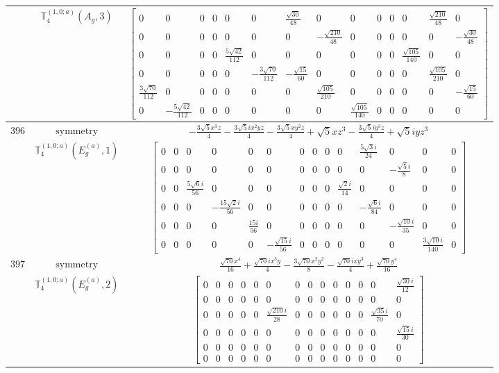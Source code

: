 \documentclass[fleqn,8pt,landscape]{jsarticle}
\begin{document}
\begin{longtable}{ccc}
$  $ & $ \mathbb{T}_{4}^{(1,0;a)}(A_{g},3) $ & $ \begin{bmatrix} 0 & 0 & 0 & 0 & 0 & 0 & \frac{\sqrt{30}}{48} & 0 & 0 & 0 & 0 & 0 & \frac{\sqrt{210}}{48} & 0 \\ 0 & 0 & 0 & 0 & 0 & 0 & 0 & - \frac{\sqrt{210}}{48} & 0 & 0 & 0 & 0 & 0 & - \frac{\sqrt{30}}{48} \\ 0 & 0 & 0 & 0 & \frac{5 \sqrt{42}}{112} & 0 & 0 & 0 & 0 & 0 & 0 & \frac{\sqrt{105}}{140} & 0 & 0 \\ 0 & 0 & 0 & 0 & 0 & - \frac{3 \sqrt{70}}{112} & - \frac{\sqrt{15}}{60} & 0 & 0 & 0 & 0 & 0 & \frac{\sqrt{105}}{210} & 0 \\ \frac{3 \sqrt{70}}{112} & 0 & 0 & 0 & 0 & 0 & 0 & \frac{\sqrt{105}}{210} & 0 & 0 & 0 & 0 & 0 & - \frac{\sqrt{15}}{60} \\ 0 & - \frac{5 \sqrt{42}}{112} & 0 & 0 & 0 & 0 & 0 & 0 & \frac{\sqrt{105}}{140} & 0 & 0 & 0 & 0 & 0 \end{bmatrix} $ \\ \hline
$ 396 $ & $ \text{symmetry} $ & $ - \frac{3 \sqrt{5} x^{3} z}{4} - \frac{3 \sqrt{5} i x^{2} y z}{4} - \frac{3 \sqrt{5} x y^{2} z}{4} + \sqrt{5} x z^{3} - \frac{3 \sqrt{5} i y^{3} z}{4} + \sqrt{5} i y z^{3} $ \\
$  $ & $ \mathbb{T}_{4}^{(1,0;a)}(E_{g}^{(a)},1) $ & $ \begin{bmatrix} 0 & 0 & 0 & 0 & 0 & 0 & 0 & 0 & 0 & 0 & \frac{5 \sqrt{3} i}{24} & 0 & 0 & 0 \\ 0 & 0 & 0 & 0 & 0 & 0 & 0 & 0 & 0 & 0 & 0 & - \frac{\sqrt{5} i}{8} & 0 & 0 \\ 0 & 0 & \frac{5 \sqrt{6} i}{56} & 0 & 0 & 0 & 0 & 0 & 0 & \frac{\sqrt{2} i}{14} & 0 & 0 & 0 & 0 \\ 0 & 0 & 0 & - \frac{15 \sqrt{2} i}{56} & 0 & 0 & 0 & 0 & 0 & 0 & - \frac{\sqrt{6} i}{84} & 0 & 0 & 0 \\ 0 & 0 & 0 & 0 & \frac{15 i}{56} & 0 & 0 & 0 & 0 & 0 & 0 & - \frac{\sqrt{10} i}{35} & 0 & 0 \\ 0 & 0 & 0 & 0 & 0 & - \frac{\sqrt{15} i}{56} & 0 & 0 & 0 & 0 & 0 & 0 & \frac{3 \sqrt{10} i}{140} & 0 \end{bmatrix} $ \\ \hline
$ 397 $ & $ \text{symmetry} $ & $ \frac{\sqrt{70} x^{4}}{16} + \frac{\sqrt{70} i x^{3} y}{4} - \frac{3 \sqrt{70} x^{2} y^{2}}{8} - \frac{\sqrt{70} i x y^{3}}{4} + \frac{\sqrt{70} y^{4}}{16} $ \\
$  $ & $ \mathbb{T}_{4}^{(1,0;a)}(E_{g}^{(a)},2) $ & $ \begin{bmatrix} 0 & 0 & 0 & 0 & 0 & 0 & 0 & 0 & 0 & 0 & 0 & 0 & 0 & \frac{\sqrt{30} i}{12} \\ 0 & 0 & 0 & 0 & 0 & 0 & 0 & 0 & 0 & 0 & 0 & 0 & 0 & 0 \\ 0 & 0 & 0 & 0 & 0 & \frac{\sqrt{210} i}{28} & 0 & 0 & 0 & 0 & 0 & 0 & \frac{\sqrt{35} i}{70} & 0 \\ 0 & 0 & 0 & 0 & 0 & 0 & 0 & 0 & 0 & 0 & 0 & 0 & 0 & \frac{\sqrt{15} i}{30} \\ 0 & 0 & 0 & 0 & 0 & 0 & 0 & 0 & 0 & 0 & 0 & 0 & 0 & 0 \\ 0 & 0 & 0 & 0 & 0 & 0 & 0 & 0 & 0 & 0 & 0 & 0 & 0 & 0 \end{bmatrix} $ \\ \hline

\end{longtable}
\end{document}
